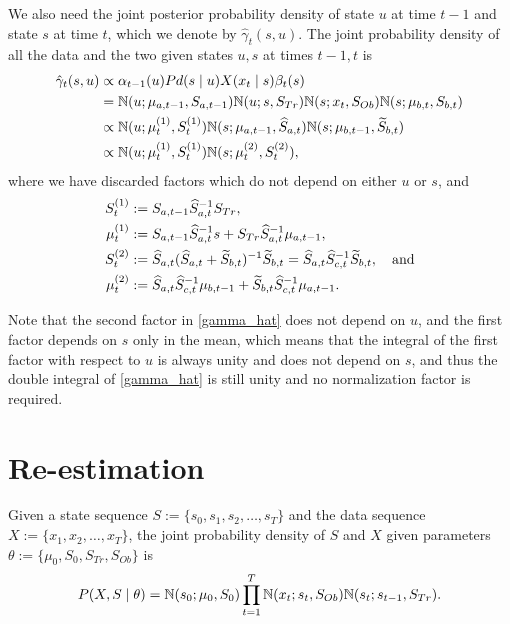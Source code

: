 \documentclass[12pt,leqno]{article}
\begin{document}
We also need the joint posterior probability density of state $u$ at time $t-1$ and state $s$ at time $t$,
which we denote by $\hat{\gamma}_t(s,u)$. The joint probability density of all the data and the two given states
  $u,s$  at times $t-1,t$ is
  \begin{align}
    \hat{\gamma}_t(s,u) &\propto \alpha_{t-1}(u)Pd(s\mid u)X(x_t\mid s)\beta_t(s) \notag\\
    &= {\mathbb N}(u;\mu_{a,t-1},S_{a,t-1}){\mathbb N}(u;s,S_{Tr})  {\mathbb N}(s;x_t,S_{Ob}){\mathbb N}(s;\mu_{b,t},S_{b,t})\notag\\
    &\propto {\mathbb N}(u;\mu^{(1)}_t,S^{(1)}_t){\mathbb N}(s;\mu_{a,t-1},\widehat{S}_{a,t}){\mathbb N}(s;\mu_{b,t-1},
    \widetilde{S}_{b,t})\notag\\
    &\propto {\mathbb N}(u;\mu^{(1)}_t,S^{(1)}_t){\mathbb N}(s;\mu^{(2)}_t,S^{(2)}_t),\label{gamma_hat}
  \end{align}
  where we have discarded factors which do not depend on either $u$ or $s$, and 
  \begin{align}
    S^{(1)}_t &:= S_{a,t-1}\widehat{S}_{a,t}^{-1}S_{Tr},\notag\\
    \mu^{(1)}_t &:= S_{a,t-1}\widehat{S}_{a,t}^{-1}s + S_{Tr}\widehat{S}_{a,t}^{-1}\mu_{a,t-1},\label{mu(1)}\\
    S^{(2)}_t &:= \widehat{S}_{a,t}(\widehat{S}_{a,t}+\widetilde{S}_{b,t})^{-1}\widetilde{S}_{b,t}
    = \widehat{S}_{a,t}\widehat{S}_{c,t}^{-1}\widetilde{S}_{b,t},\notag\quad\text{and}\\
    \mu^{(2)}_t &:= \widehat{S}_{a,t}\widehat{S}_{c,t}^{-1}\mu_{b,t-1} +
    \widetilde{S}_{b,t}\widehat{S}_{c,t}^{-1}\mu_{a,t-1}\label{mu(2)}.
  \end{align}

  Note that the second factor in \eqref{gamma_hat} does not depend on $u$, and the first factor depends on $s$
  only in the mean, which means that the integral of the first factor with respect to $u$ is always unity
  and does not depend on $s$, and thus the double integral of \eqref{gamma_hat} is still unity and no
  normalization factor is required.
  
\section{Re-estimation}
Given a state sequence $S := \{s_0,s_1,s_2,\dots,s_T\}$ and the data sequence $X := \{x_1,x_2,\dots,x_T\}$, the
joint probability density of $S$ and $X$ given parameters $\theta := \{\mu_0,S_0,S_{Tr},S_{Ob}\}$ is
$$
P(X,S\mid\theta) = {\mathbb N}(s_0;\mu_0,S_0)\prod_{t=1}^T{\mathbb N}(x_t;s_t,S_{Ob}){\mathbb N}(s_t;s_{t-1},S_{Tr}).
$$
\end{document}
